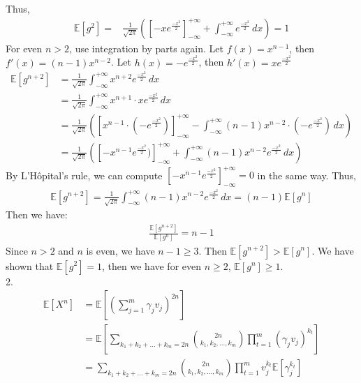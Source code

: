 Thus,
\begin{align}
    \nonumber \mathbb{E}[g^2]=&\frac{1}{\sqrt{2\pi}}(\left[-xe^{\frac{-x^2}{2}}\right]_{-\infty}^{+\infty}+\int_{-\infty }^{+\infty }e^{\frac{-x^2}{2}}\,dx )=1
\end{align}
For even $n > 2$, use integration by parts again.
Let $f(x)=x^{n-1}$, then $f'(x)=(n-1)x^{n-2}$. Let $h(x)=-e^{\frac{-x^2}{2}} $, then $h'(x)= xe^{\frac{-x^2}{2}}$
\begin{align}
    \nonumber \mathbb{E}[g^{n+2}]&=\frac{1}{\sqrt{2\pi}}\int_{-\infty }^{+\infty }x^{n+2}e^{\frac{-x^2}{2}}\,dx\\
    \nonumber &=\frac{1}{\sqrt{2\pi}}\int_{-\infty }^{+\infty }x^{n+1}\cdot x e^{\frac{-x^2}{2}}\,dx\\
    \nonumber &=\frac{1}{\sqrt{2\pi}}\left(\left[x^{n-1}\cdot (-e^{\frac{-x^2}{2}})\right]_{-\infty}^{+\infty}-\int_{-\infty }^{+\infty }(n-1)x^{n-2}\cdot (-e^{\frac{-x^2}{2}})\,dx \right)\\
    \nonumber &=\frac{1}{\sqrt{2\pi}}\left(\left[-x^{n-1}e^{\frac{-x^2}{2}})\right]_{-\infty}^{+\infty}+\int_{-\infty }^{+\infty }(n-1)x^{n-2}e^{\frac{-x^2}{2}}\,dx \right)
\end{align}
By L'Hôpital's rule, we can compute $\left[-x^{n-1}e^{\frac{-x^2}{2}}\right]_{-\infty}^{+\infty}=0$ in the same way.
Thus,
\begin{align}
    \nonumber \mathbb{E}[g^{n+2}]=\frac{1}{\sqrt{2\pi}}\int_{-\infty }^{+\infty }(n-1)x^{n-2}e^{\frac{-x^2}{2}}\,dx 
    =(n-1)\mathbb{E}[g^{n}]
\end{align} 
Then we have:
\begin{align}
    \nonumber \frac{\mathbb{E}[g^{n+2}]}{\mathbb{E}[g^{n}]}=n-1
\end{align}
Since $n>2$ and $n$ is even, we have $n-1\ge 3$.
Then $\mathbb{E}[g^{n+2}]>\mathbb{E}[g^{n}]$.
We have shown that $\mathbb{E}[g^{2}]=1$, then we have for even $n \ge 2$, $\mathbb{E}[g^n]\ge 1$.\\
2.
\begin{align}
    \nonumber \mathbb{E}[X^n]&=\mathbb{E}\left[\left(\sum_{j=1}^{m}\gamma _jv_j\right)^{2n}\right]\\
    \nonumber &=\mathbb{E}\left[\sum_{k_1+k_2+...+k_m=2n}\binom{2n}{k_1,k_2,...,k_m}\prod_{t=1}^{m}(\gamma_jv_j)^{k_t} \right]\\
    \nonumber &=\sum_{k_1+k_2+...+k_m=2n}\binom{2n}{k_1,k_2,...,k_m}\prod_{t=1}^{m}v_j^{k_t}\mathbb{E}\left[\gamma_j^{k_t}\right]
\end{align}
